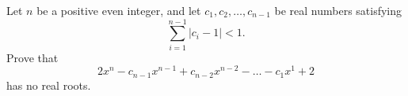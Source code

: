 Let $n$ be a positive even integer, and let $c_1, c_2, \dots, c_{n-1}$ be real numbers satisfying \[ \sum_{i=1}^{n-1} \left\lvert c_i-1 \right\rvert < 1. \] Prove that \[2x^n - c_{n-1}x^{n-1} + c_{n-2}x^{n-2} - \dots - c_1x^1 + 2\] has no real roots.